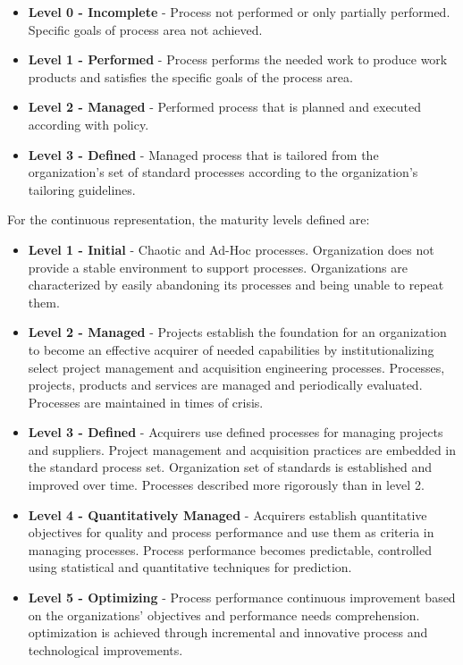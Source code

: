 \begin{itemize}

\item \textbf{Level 0 - Incomplete} - Process not performed or only partially performed. Specific goals of process area not achieved.

\item \textbf{Level 1 - Performed} - Process performs the needed work to produce work products and satisfies the specific goals of the process area.

\item \textbf{Level 2 - Managed} - Performed process that is planned and executed according with policy.

\item \textbf{Level 3 - Defined} - Managed process that is tailored from the organization's set of standard processes according to the organization's tailoring guidelines.
 
\end{itemize}

For the continuous representation, the maturity levels defined are:

\begin{itemize}

\item \textbf{Level 1 - Initial} - Chaotic and Ad-Hoc processes. Organization does not provide a stable environment to support processes. Organizations are characterized by easily abandoning its processes and being unable to repeat them.

\item \textbf{Level 2 - Managed} - Projects establish the foundation for an organization to become an effective acquirer of needed capabilities by institutionalizing select project management and acquisition engineering processes. Processes, projects, products and services are managed and periodically evaluated. Processes are maintained in times of crisis.

\item \textbf{Level 3 - Defined} - Acquirers use defined processes for managing projects and suppliers. Project management and acquisition practices are embedded in the standard process set. Organization set of standards is established and improved over time. Processes described more rigorously than in level 2.

\item \textbf{Level 4 - Quantitatively Managed} - Acquirers establish quantitative objectives for quality and process performance and use them as criteria in managing processes. Process performance becomes predictable, controlled using statistical and quantitative techniques for prediction.

\item \textbf{Level 5 - Optimizing} - Process performance continuous improvement based on the organizations' objectives and performance needs comprehension. optimization is achieved through incremental and innovative process and technological improvements.

\end{itemize}

